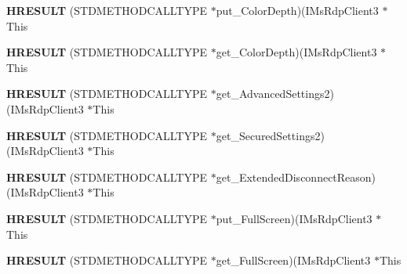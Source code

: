 \begin{DoxyCompactItemize}
\item 
\mbox{\label{struct_i_ms_rdp_client3_vtbl_a4e2b64675614456218c85597b52bd667}} 
{\bfseries H\+R\+E\+S\+U\+LT} (S\+T\+D\+M\+E\+T\+H\+O\+D\+C\+A\+L\+L\+T\+Y\+PE $\ast$put\+\_\+\+Color\+Depth)(I\+Ms\+Rdp\+Client3 $\ast$This
\item 
\mbox{\label{struct_i_ms_rdp_client3_vtbl_a097bdacb221028c365cf15b2790e9c6d}} 
{\bfseries H\+R\+E\+S\+U\+LT} (S\+T\+D\+M\+E\+T\+H\+O\+D\+C\+A\+L\+L\+T\+Y\+PE $\ast$get\+\_\+\+Color\+Depth)(I\+Ms\+Rdp\+Client3 $\ast$This
\item 
\mbox{\label{struct_i_ms_rdp_client3_vtbl_a489212ffa09ca7ff0916fdb925c22004}} 
{\bfseries H\+R\+E\+S\+U\+LT} (S\+T\+D\+M\+E\+T\+H\+O\+D\+C\+A\+L\+L\+T\+Y\+PE $\ast$get\+\_\+\+Advanced\+Settings2)(I\+Ms\+Rdp\+Client3 $\ast$This
\item 
\mbox{\label{struct_i_ms_rdp_client3_vtbl_a363f91ee42b80d87ef024870c63c546a}} 
{\bfseries H\+R\+E\+S\+U\+LT} (S\+T\+D\+M\+E\+T\+H\+O\+D\+C\+A\+L\+L\+T\+Y\+PE $\ast$get\+\_\+\+Secured\+Settings2)(I\+Ms\+Rdp\+Client3 $\ast$This
\item 
\mbox{\label{struct_i_ms_rdp_client3_vtbl_aa09d698b6ef1d113b2ad5c6cdd9af89f}} 
{\bfseries H\+R\+E\+S\+U\+LT} (S\+T\+D\+M\+E\+T\+H\+O\+D\+C\+A\+L\+L\+T\+Y\+PE $\ast$get\+\_\+\+Extended\+Disconnect\+Reason)(I\+Ms\+Rdp\+Client3 $\ast$This
\item 
\mbox{\label{struct_i_ms_rdp_client3_vtbl_a5eb7000401897ad44ba1b8d67bb9c23d}} 
{\bfseries H\+R\+E\+S\+U\+LT} (S\+T\+D\+M\+E\+T\+H\+O\+D\+C\+A\+L\+L\+T\+Y\+PE $\ast$put\+\_\+\+Full\+Screen)(I\+Ms\+Rdp\+Client3 $\ast$This
\item 
\mbox{\label{struct_i_ms_rdp_client3_vtbl_a79ea0b1c4d0752253913b0dae650ee1b}} 
{\bfseries H\+R\+E\+S\+U\+LT} (S\+T\+D\+M\+E\+T\+H\+O\+D\+C\+A\+L\+L\+T\+Y\+PE $\ast$get\+\_\+\+Full\+Screen)(I\+Ms\+Rdp\+Client3 $\ast$This
\item 
\mbox{\label{struct_i_ms_rdp_client3_vtbl_a67b83ecc261f691ffeb75551e98d4f06}} 

\end{DoxyCompactItemize}
